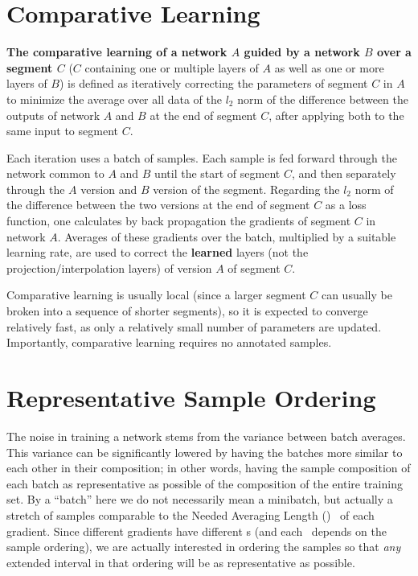 \documentclass{article} %
\begin{document}

\section{Comparative Learning}
\label{sec:tunning}
\textbf{The comparative learning of a network $A$ guided by a network $B$ over a segment $C$} ($C$ containing one or multiple layers of $A$ as well as one or more layers of $B$) is defined as iteratively correcting the parameters of segment $C$ in $A$ to minimize the average over all data of the $l_2$ norm of the difference between the outputs of network $A$ and $B$ at the end of segment $C$, after applying both to the same input to segment $C$.

Each iteration uses a batch of samples. Each sample is fed forward through the network common to $A$ and $B$ until the start of segment $C$, and then separately through the $A$ version and $B$ version of the segment. Regarding the $l_2$ norm of the difference between the two versions at the end of segment $C$ as a loss function, one calculates by back propagation the gradients of segment $C$ in network $A$. Averages of these gradients over the batch, multiplied by a suitable learning rate, are used to correct the \textbf{learned} layers (not the projection/interpolation layers) of version $A$ of segment $C$.

Comparative learning is usually local (since a larger segment $C$ can usually be broken into a sequence of shorter segments), so it is expected to converge relatively fast, as only a relatively small number of parameters are updated. Importantly, comparative learning requires no annotated samples.


\section{Representative Sample Ordering}
\label{sec:ordering}
The noise in training a network stems from the variance between batch averages. This variance can be significantly lowered by having the batches more similar to each other in their composition; in other words, having the sample composition of each batch as representative as possible of the composition of the entire training set. By a ``batch'' here we do not necessarily mean a minibatch, but actually a stretch of samples comparable to the Needed Averaging Length (\NAL)~ of each gradient. 
Since different gradients have different {\NAL}s (and each \NAL~depends on the sample ordering), we are actually interested in ordering the samples so that \emph{any} extended interval in that ordering will be as representative as possible.
\end{document}

